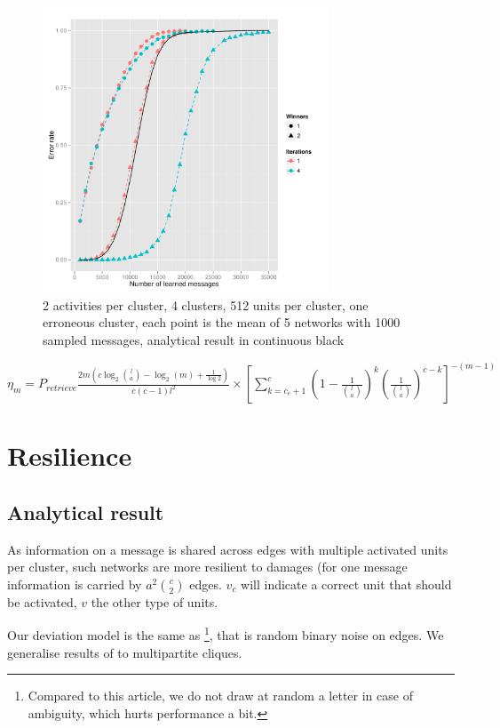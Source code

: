 \documentclass[english,10pt,twocolumn]{IEEEtran}
\theoremstyle{definition}
\begin{document}
	\begin{figure}[!htb]
		\includegraphics[width=8.5cm]{Courbes/remplacement_figure3g1}
		\caption{2 activities per cluster, 4 clusters, 512 units per cluster, one erroneous cluster, each point is the mean of 5 networks with 1000 sampled messages, analytical result in continuous black}
		\label{corruptth}
	\end{figure}
		
		$\eta_m = P_{retrieve}  \frac{2 m\left(c \log_2{l \choose a } - \log_2(m) + \frac{1}{\log 2} \right)}{c(c-1)l^2} \times \left [\sum_{k = c_e+1}^{c} \left (1-\frac{1}{{l \choose a}} \right )^k \left (\frac{1}{{l \choose a}} \right )^{c-k} \right ] ^{-(m-1)}$
		
		

	
	\section{Resilience}
	\subsection{Analytical result}
	
	As information on a message is shared across edges with multiple activated units per cluster, such networks are more resilient to damages (for one message information is carried by $a^2 {c \choose 2}$ edges. $v_c$ will indicate a correct unit that should be activated, $v$ the other type of units.
	
	Our deviation model is the same as \cite{LedGriRabGro20145}\footnote{Compared to this article, we do not draw at random a letter in case of ambiguity, which hurts performance a bit.}, that is random binary noise on edges. We generalise results of \cite{LedGriRabGro20145} to multipartite cliques.
	
\end{document}
